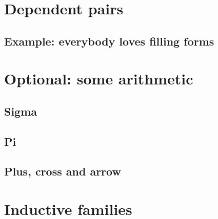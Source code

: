 \documentclass{beamer}
\begin{document}
\section{Dependent pairs}

\subsection{Example: everybody loves filling forms}

\section{Optional: some arithmetic}

\subsection{Sigma}

\subsection{Pi}

\subsection{Plus, cross and arrow}


\section{Inductive families}
\end{document}
